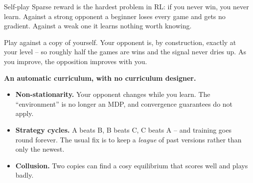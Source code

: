 \documentclass[aspectratio=169]{beamer}
\begin{document}
\begin{frame}{Self-play}
  \small
  Sparse reward is the hardest problem in RL: if you never win, you never learn. Against a
  strong opponent a beginner loses every game and gets no gradient. Against a weak one it learns
  nothing worth knowing.

  \vskip 6pt
  \begin{tcolorbox}[colback=paramgreen!8, colframe=paramgreen, boxrule=0.7pt, arc=2pt,
                    title={\textbf{Self-play solves this for free}}]
    \small
    Play against a copy of yourself. Your opponent is, by construction, exactly at your level --
    so roughly half the games are wins and the signal never dries up. As you improve, the
    opposition improves with you.

    \vskip 4pt
    \textbf{An automatic curriculum, with no curriculum designer.}
  \end{tcolorbox}

  \vskip 6pt
  \begin{tcolorbox}[colback=armred!8, colframe=armred, boxrule=0.6pt, arc=2pt,
                    title={\textbf{And the ways it goes wrong}}]
    \small
    \begin{itemize}\itemsep2pt
      \item \textbf{Non-stationarity.} Your opponent changes while you learn. The ``environment''
            is no longer an MDP, and convergence guarantees do not apply.
      \item \textbf{Strategy cycles.} A beats B, B beats C, C beats A -- and training goes round
            forever. The usual fix is to keep a \emph{league} of past versions rather than only
            the newest.
      \item \textbf{Collusion.} Two copies can find a cosy equilibrium that scores well and
            plays badly.
    \end{itemize}
  \end{tcolorbox}
\end{frame}
\end{document}
